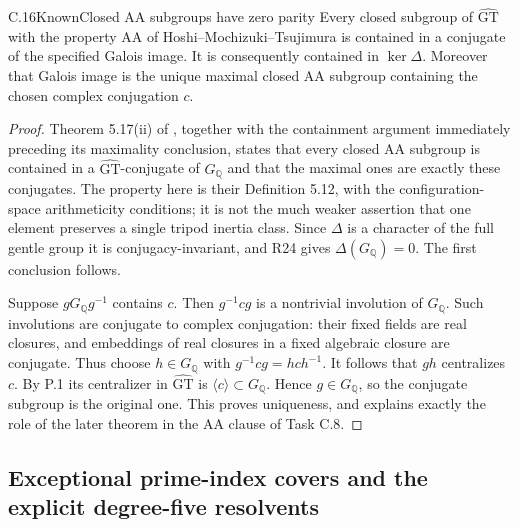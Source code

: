 \begin{statement}{C.16}{Known}{Closed AA subgroups have zero parity}
Every closed subgroup of $\widehat{\mathrm{GT}}$ with the property
AA of Hoshi--Mochizuki--Tsujimura is contained in a conjugate of
the specified Galois image. It is consequently contained in
$\ker\Delta$. Moreover that Galois image is the unique maximal
closed AA subgroup containing the chosen complex conjugation $c$.
\end{statement}
\begin{proof}
Theorem 5.17(ii) of \cite{PBC_HMT2025}, together with the containment
argument immediately preceding its maximality conclusion, states
that every closed AA subgroup is contained in a
$\widehat{\mathrm{GT}}$-conjugate of $G_{\mathbb Q}$ and that the
maximal ones are exactly these conjugates. The property here is
their Definition 5.12, with the configuration-space arithmeticity
conditions; it is not the much weaker assertion that one element
preserves a single tripod inertia class. Since $\Delta$ is a
character of the full gentle group it is conjugacy-invariant, and
R24 gives $\Delta(G_{\mathbb Q})=0$. The first conclusion follows.

Suppose $gG_{\mathbb Q}g^{-1}$ contains $c$. Then
$g^{-1}cg$ is a nontrivial involution of $G_{\mathbb Q}$. Such
involutions are conjugate to complex conjugation: their fixed
fields are real closures, and embeddings of real closures in a
fixed algebraic closure are conjugate. Thus choose $h\in G_{\mathbb Q}$
with $g^{-1}cg=hch^{-1}$. It follows that $gh$ centralizes $c$.
By P.1 its centralizer in $\widehat{\mathrm{GT}}$ is
$\langle c\rangle\subset G_{\mathbb Q}$. Hence $g\in G_{\mathbb Q}$,
so the conjugate subgroup is the original one. This proves
uniqueness, and explains exactly the role of the later theorem
in the AA clause of Task C.8.
\end{proof}

\subsection{Exceptional prime-index covers and the explicit degree-five resolvents}

